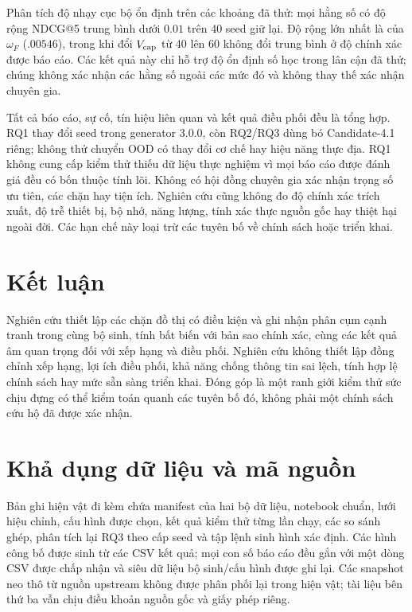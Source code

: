 \documentclass[runningheads]{llncs}
\begin{document}
Phân tích độ nhạy cục bộ ổn định trên các khoảng đã thử: mọi hằng số có độ
rộng NDCG@5 trung bình dưới $0.01$ trên 40 seed giữ lại. Độ rộng lớn nhất là
của $\omega_F$ ($.00546$), trong khi đổi $V_{\rm cap}$ từ 40 lên 60 không
đổi trung bình ở độ chính xác được báo cáo. Các kết quả này chỉ hỗ trợ độ
ổn định số học trong lân cận đã thử; chúng không xác nhận các hằng số ngoài
các mức đó và không thay thế xác nhận chuyên gia.

Tất cả báo cáo, sự cố, tín hiệu liên quan và kết quả điều phối đều là tổng
hợp. RQ1 thay đổi seed trong generator 3.0.0, còn RQ2/RQ3 dùng bó
Candidate-4.1 riêng; không thử chuyển OOD có thay đổi cơ chế hay hiệu năng
thực địa. RQ1 không cung cấp kiểm thử thiếu dữ liệu thực nghiệm vì mọi báo
cáo được đánh giá đều có bốn thuộc tính lõi. Không có hội đồng chuyên gia
xác nhận trọng số ưu tiên, các chặn hay tiện ích. Nghiên cứu cũng không đo
độ chính xác trích xuất, độ trễ thiết bị, bộ nhớ, năng lượng, tính xác thực
nguồn gốc hay thiệt hại ngoài đời. Các hạn chế này loại trừ các tuyên bố về
chính sách hoặc triển khai.

\section{Kết luận}

Nghiên cứu thiết lập các chặn đồ thị có điều kiện và ghi nhận phân cụm cạnh
tranh trong cùng bộ sinh, tính bất biến với bản sao chính xác, cùng các kết
quả âm quan trọng đối với xếp hạng và điều phối. Nghiên cứu không thiết lập
đồng chỉnh xếp hạng, lợi ích điều phối, khả năng chống thông tin sai lệch,
tính hợp lệ chính sách hay mức sẵn sàng triển khai. Đóng góp là một ranh giới
kiểm thử sức chịu đựng có thể kiểm toán quanh các tuyên bố đó, không phải một
chính sách cứu hộ đã được xác nhận.

\section*{Khả dụng dữ liệu và mã nguồn}

Bản ghi hiện vật đi kèm chứa manifest của hai bộ dữ liệu, notebook chuẩn,
lưới hiệu chỉnh, cấu hình được chọn, kết quả kiểm thử từng lần chạy, các so
sánh ghép, phân tích lại RQ3 theo cấp seed và tập lệnh sinh hình xác định.
Các hình công bố được sinh từ các CSV kết quả; mọi con số báo cáo đều gắn với
một dòng CSV được chấp nhận và siêu dữ liệu bộ sinh/cấu hình được ghi lại.
Các snapshot neo thô từ nguồn upstream không được phân phối lại trong hiện
vật; tài liệu bên thứ ba vẫn chịu điều khoản nguồn gốc và giấy phép riêng.
\end{document}
